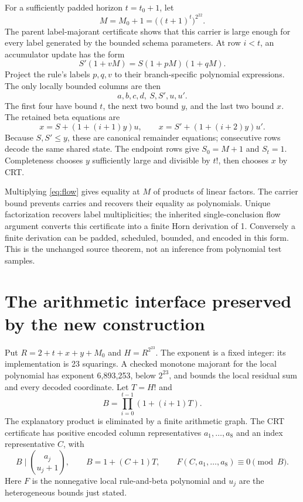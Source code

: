 \documentclass[10pt,letterpaper]{article}
\theoremstyle{remark}\newtheorem{remark}[theorem]{Remark}
\begin{document}
For a sufficiently padded horizon $t=t_0+1$, let
\[
 M=M_0+1=\bigl((t+1)^t\bigr)^{2^{22}}.
\]
The parent label-majorant certificate shows that this carrier is large
enough for every label generated by the bounded schema parameters.
At row $i<t$, an accumulator update has the form
\begin{equation}\label{eq:flow}
 S'(1+vM)=S(1+pM)(1+qM).
\end{equation}
Project the rule's labels $p,q,v$ to their branch-specific polynomial
expressions. The only locally bounded columns are then
\[
 a,b,c,d,\ S,S',u,u'.
\]
The first four have bound $t$, the next two bound $y$, and the last two
bound $x$. The retained beta equations are
\[
 x=S+(1+(i+1)y)u,\qquad
 x=S'+(1+(i+2)y)u'.
\]
Because $S,S'\le y$, these are canonical remainder equations; consecutive
rows decode the same shared state. The endpoint rows give $S_0=M+1$ and
$S_t=1$. Completeness chooses $y$ sufficiently large and divisible by
$t!$, then chooses $x$ by CRT.

Multiplying \eqref{eq:flow} gives equality at $M$ of products of linear
factors. The carrier bound prevents carries and recovers their equality
as polynomials. Unique factorization recovers label multiplicities; the
inherited single-conclusion flow argument converts this certificate into
a finite Horn derivation of 1. Conversely a finite derivation can be
padded, scheduled, bounded, and encoded in this form. This is the
unchanged source theorem, not an inference from polynomial test samples.

\section{The arithmetic interface preserved by the new construction}
\label{sec:crt}

Put $R=2+t+x+y+M_0$ and $H=R^{2^{23}}$. The exponent is a fixed integer:
its implementation is 23 squarings. A checked monotone majorant for the
local polynomial has exponent 6,893,253, below $2^{23}$, and bounds the
local residual sum and every decoded coordinate. Let $T=H!$ and
\[
 B=\prod_{i=0}^{t-1}(1+(i+1)T).
\]
The explanatory product is eliminated by a finite arithmetic graph.
The CRT certificate has positive encoded column representatives
$a_1,\ldots,a_8$ and an index representative $C$, with
\begin{equation}\label{eq:crtcert}
 B\mid\binom{a_j}{u_j+1},\qquad
 B=1+(C+1)T,\qquad F(C,a_1,\ldots,a_8)\equiv0\pmod B.
\end{equation}
Here $F$ is the nonnegative local rule-and-beta polynomial and $u_j$ are
the heterogeneous bounds just stated.
\end{document}
